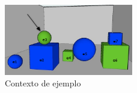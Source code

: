 
\begin{figure}[ht]
\begin{center}
\includegraphics[width=0.5\textwidth]{images/3b.png}
\caption{Contexto de ejemplo}\label{GRE3D7-stimulus-cap2}
\end{center}
\end{figure}

